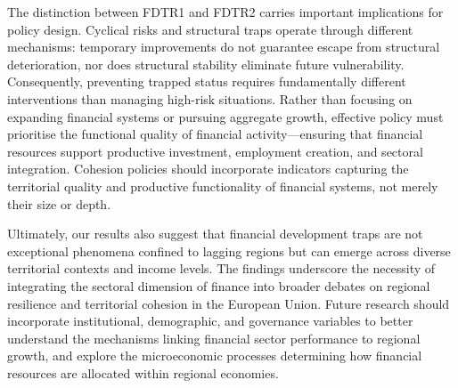 \documentclass[a4paper,11pt,oneside]{article}
\begin{document}
The distinction between FDTR1 and FDTR2 carries important implications for policy design. Cyclical risks and structural traps operate through different mechanisms: temporary improvements do not guarantee escape from structural deterioration, nor does structural stability eliminate future vulnerability. Consequently, preventing trapped status requires fundamentally different interventions than managing high-risk situations. Rather than focusing on expanding financial systems or pursuing aggregate growth, effective policy must prioritise the functional quality of financial activity---ensuring that financial resources support productive investment, employment creation, and sectoral integration. Cohesion policies should incorporate indicators capturing the territorial quality and productive functionality of financial systems, not merely their size or depth.

Ultimately, our results also suggest that financial development traps are not exceptional phenomena confined to lagging regions but can emerge across diverse territorial contexts and income levels. The findings underscore the necessity of integrating the sectoral dimension of finance into broader debates on regional resilience and territorial cohesion in the European Union.  Future research should incorporate institutional, demographic, and governance variables to better understand the mechanisms linking financial sector performance to regional growth, and explore the microeconomic processes determining how financial resources are allocated within regional economies.



\color{black}



\end{document}
